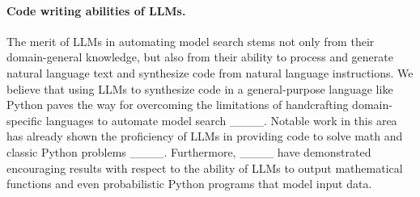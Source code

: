 \paragraph{Code writing abilities of LLMs.}
The merit of LLMs in automating model search stems not only from their domain-general knowledge, but also from their ability to process and generate natural language text and synthesize code from natural language instructions. We believe that using LLMs to synthesize code in a general-purpose language like Python paves the way for overcoming the limitations of handcrafting domain-specific languages to automate model search ____.
Notable work in this area has already shown the proficiency of LLMs in providing code to solve math and classic Python problems ____. Furthermore, ____ have demonstrated encouraging results with respect to the ability of LLMs to output mathematical functions and even probabilistic Python programs that model input data.